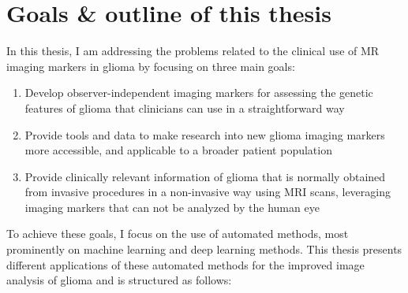 \section{Goals \& outline of this thesis}

In this thesis, I am addressing the problems related to the clinical use of \acrshort{MR} imaging markers in glioma by focusing on three main goals:

\begin{enumerate}
\item Develop observer-independent imaging markers for assessing the genetic features of \gls{glioma} that clinicians can use in a straightforward way
\item Provide tools and data to make research into new \gls{glioma} imaging markers more accessible, and applicable to a broader patient population
\item Provide clinically relevant information of \gls{glioma} that is normally obtained from invasive procedures in a non-invasive way using \gls{MRI} scans, leveraging imaging markers that can not be analyzed by the human eye
\end{enumerate}

To achieve these goals, I focus on the use of automated methods, most prominently on machine learning and deep learning methods.
This thesis presents different applications of these automated methods for the improved image analysis of glioma and is structured as follows:

